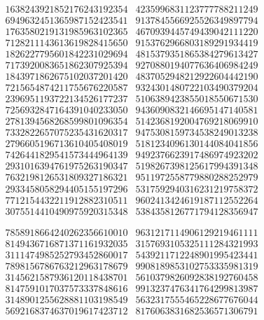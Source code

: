 {\[\begin{array}{rr}
1638243921852176243192354 &
4235996831123777788211249 \\
6949632451365987152423541 &
9137845566925526349897794 \\
1763580219131985963102365 &
4670939445749439042111220 \\
7128211143613619828415650 &
9153762966803189291934419 \\
1826227795601842231029694 &
4815379351865384279613427 \\
7173920083651862307925394 &
9270880194077636406984249 \\
1843971862675102037201420 &
4837052948212922604442190 \\
7215654874211755676220587 &
9324301480722103490379204 \\
2396951193722134526177237 &
5106389423855018550671530 \\
7256932847164391040233050 &
9436090832146695147140581 \\
2781394568268599801096354 &
5142368192004769218069910 \\
7332822657075235431620317 &
9475308159734538249013238 \\
2796605196713610405408019 &
5181234096130144084041856 \\
7426441829541573444964139 &
9492376623917486974923202 \\
2931016394761975263190347 &
5198267398125617994391348 \\
7632198126531809327186321 &
9511972558779880288252979 \\
2933458058294405155197296 &
5317592940316231219758372 \\
7712154432211912882310511 &
9602413424619187112552264 \\
3075514410490975920315348 &
5384358126771794128356947
\end{array}\]

\[\begin{array}{rr}
7858918664240262356610010 &
9631217114906129219461111 \\
8149436716871371161932035 &
3157693105325111284321993 \\
3111474985252793452860017 &
5439211712248901995423441 \\
7898156786763212963178679 &
9908189853102753335981319 \\
3145621587936120118438701 &
5610379826092838192760458 \\
8147591017037573337848616 &
9913237476341764299813987 \\
3148901255628881103198549 &
5632317555465228677676044 \\
5692168374637019617423712 &
8176063831682536571306791
\end{array}\]
}
 
